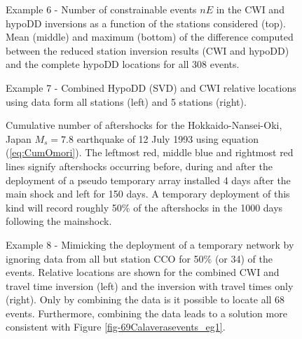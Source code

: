 \documentclass[12pt,double]{article}
\begin{document}

\begin{figure}
\caption{Example 6 - Number of constrainable events $nE$ in the CWI
and hypoDD inversions as a function of the stations considered
(top). Mean (middle) and maximum (bottom) of the difference computed
between the reduced station inversion results (CWI and hypoDD) and
the complete hypoDD locations for all 308 events. }
\label{fig-statremoval_summarystats}
\end{figure}



\begin{figure}
\caption{Example 7 - Combined HypoDD (SVD) and CWI relative
locations using data form all stations (left) and 5 stations
(right).} \label{fig-68Calaverasevents_ttandcoda1}
\end{figure}




\begin{figure}
\caption{Cumulative number of aftershocks for the
Hokkaido-Nansei-Oki, Japan $M_s=7.8$ earthquake of 12 July 1993
using equation (\ref{eq:CumOmori}). The leftmost red, middle blue
and rightmost red lines signify aftershocks occurring before, during
and after the deployment of a pseudo temporary array installed 4
days after the main shock and left for 150 days. A temporary
deployment of this kind will record roughly 50\% of the aftershocks
in the 1000 days following the mainshock. } \label{fig:Omorifigure}
\end{figure}



\begin{figure}
\caption{Example 8 - Mimicking the deployment of a temporary network
by ignoring data from all but station CCO for 50\% (or 34) of the
events. Relative locations are shown for the combined CWI and travel
time inversion (left) and the inversion with travel times only
(right). Only by combining the data is it possible to locate all 68
events. Furthermore, combining the data leads to a solution more
consistent with Figure \ref{fig-69Calaverasevents_eg1}. }
\label{fig-68Calaverasevents_ttsubsetandcoda1}
\end{figure}
\end{document}
